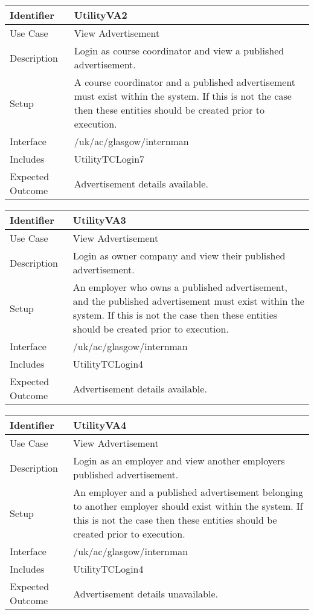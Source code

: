 \vspace{2em}

\begin{tabularx}{\textwidth}{|T|L|}
\hline
Identifier & UtilityVA2\\
\hline
Use Case & View Advertisement \\
\hline
Description & Login as course coordinator and view a published advertisement.\\
\hline
Setup & A course coordinator and a published advertisement must exist
within the system. If this is not the case then these entities should
be created prior to execution.\\
\hline
Interface & /uk/ac/glasgow/internman \\
\hline
Includes & UtilityTCLogin7\\
\hline
Expected Outcome & Advertisement details available.\\
\hline
\end{tabularx}

\vspace{2em}

\begin{tabularx}{\textwidth}{|T|L|}
\hline
Identifier & UtilityVA3\\
\hline
Use Case & View Advertisement \\
\hline
Description & Login as owner company and view their published advertisement.\\
\hline
Setup & An employer who owns a published advertisement, and the
published advertisement must exist within the system. If this is not
the case then these entities should be created prior to execution.\\
\hline
Interface & /uk/ac/glasgow/internman \\
\hline
Includes & UtilityTCLogin4 \\
\hline
Expected Outcome & Advertisement details available.\\
\hline
\end{tabularx}

\vspace{2em}

\begin{tabularx}{\textwidth}{|T|L|}
\hline
Identifier & UtilityVA4\\
\hline
Use Case & View Advertisement \\
\hline
Description & Login as an employer and view another employers published 
advertisement.\\
\hline
Setup & An employer and a published advertisement belonging to another
employer should exist within the system. If this is not the case
then these entities should be created prior to execution.\\
\hline
Interface & /uk/ac/glasgow/internman \\
\hline
Includes & UtilityTCLogin4 \\
\hline
Expected Outcome & Advertisement details unavailable.\\
\hline
\end{tabularx}

